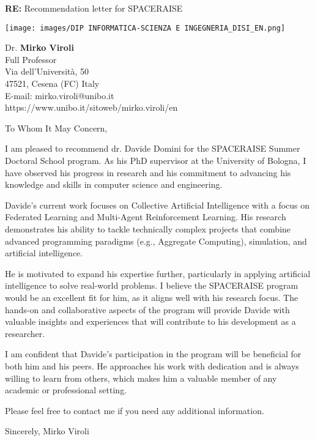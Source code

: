 \documentclass[12pt,a4paper]{letter} %
\makeatletter
\newcommand{\Who}{Mirko Viroli} %
\newcommand{\Role}{Full Professor} %
\newcommand{\Title}{Dr.} %
\newcommand{\Department}{Department of Computer Science and Engineering} %
\newcommand{\Affiliation}{Alma Mater Studiorum---Università di Bologna} %
\newcommand{\Address}{Via dell'Università, 50} %
\newcommand{\CityZip}{47521, Cesena (FC) Italy} %
\newcommand{\Email}{E-mail: mirko.viroli@unibo.it} %
\newcommand{\URL}{https://www.unibo.it/sitoweb/mirko.viroli/en} %
\makeatother
\begin{document}
\begin{letter}{\textbf{RE:} Recommendation letter for SPACERAISE}

\begin{minipage}{0.37\textwidth}
    \texttt{[image: images/DIP INFORMATICA-SCIENZA E INGEGNERIA\_DISI\_EN.png]} %
\end{minipage}%
\hfill
\begin{minipage}{0.4\textwidth}
    \small
    \Title{} \textbf{\Who{}}\\
    \Role{}    \vspace{0.05\textwidth} \\
    \scriptsize
    \Address{}\\
    \CityZip{}\\
    \Email{}\\
    \URL{}\\
\end{minipage}\label{fig:figure}

\vspace{10mm}

\opening{To Whom It May Concern,}
I am pleased to recommend dr. Davide Domini for the SPACERAISE Summer Doctoral School program.
%
As his PhD supervisor at the University of Bologna,
I have observed his progress in research and his commitment to advancing his knowledge and skills in computer science and engineering.

Davide's current work focuses on Collective Artificial Intelligence with a focus on Federated Learning and Multi-Agent Reinforcement Learning.
His research demonstrates his ability to tackle technically complex projects that combine advanced programming paradigms (e.g., Aggregate Computing),
simulation, and artificial intelligence.
%

He is motivated to expand his expertise further, particularly in applying artificial intelligence to solve real-world problems.
%
I believe the SPACERAISE program would be an excellent fit for him,
as it aligns well with his research focus.
%
The hands-on and collaborative aspects of the program will provide Davide with valuable insights and experiences that will contribute to his development as a researcher.

I am confident that Davide's participation in the program will be beneficial for both him and his peers.
%
He approaches his work with dedication and is always willing to learn from others,
which makes him a valuable member of any academic or professional setting.

Please feel free to contact me if you need any additional information.

\vspace{0.1\textwidth}

\hfill{}Sincerely, \Who





\end{letter}
\end{document}
